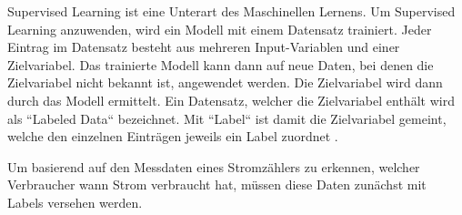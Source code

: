 Supervised Learning ist eine Unterart des Maschinellen Lernens.
Um Supervised Learning anzuwenden, wird ein Modell mit einem Datensatz trainiert.
Jeder Eintrag im Datensatz besteht aus mehreren Input-Variablen und einer Zielvariabel.
Das trainierte Modell kann dann auf neue Daten, bei denen die Zielvariabel nicht bekannt ist, angewendet werden.
Die Zielvariabel wird dann durch das Modell ermittelt.
Ein Datensatz, welcher die Zielvariabel enthält wird als ``Labeled Data`` bezeichnet.
Mit ``Label`` ist damit die Zielvariabel gemeint,
welche den einzelnen Einträgen jeweils ein Label zuordnet \parencite{ml_for_dummies}.

Um basierend auf den Messdaten eines Stromzählers zu erkennen,
welcher Verbraucher wann Strom verbraucht hat,
müssen diese Daten zunächst mit Labels versehen werden.


